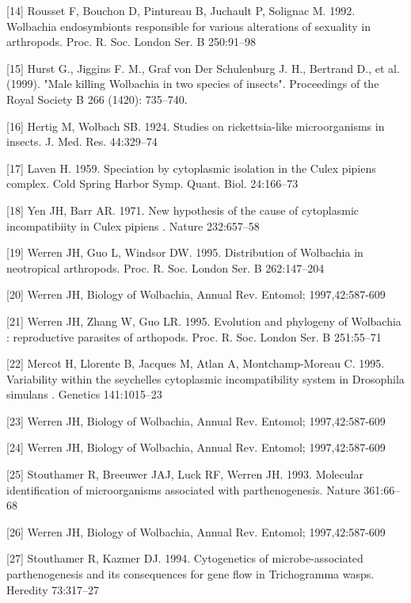 \documentclass[twocolumn]{article}
\begin{document}
[14] Rousset F, Bouchon D, Pintureau B, Juchault P, Solignac M. 1992. Wolbachia endosymbionts responsible for various alterations of sexuality in arthropods. Proc. R. Soc. London Ser. B 250:91–98

[15] Hurst G., Jiggins F. M., Graf von Der Schulenburg J. H., Bertrand D., et al. (1999). "Male killing Wolbachia in two species of insects". Proceedings of the Royal Society B 266 (1420): 735–740.  

[16] Hertig M, Wolbach SB. 1924. Studies on rickettsia-like microorganisms in insects. J. Med. Res. 44:329–74

[17] Laven H. 1959. Speciation by cytoplasmic isolation in the Culex pipiens complex. Cold Spring Harbor Symp. Quant. Biol. 24:166–73

[18] Yen JH, Barr AR. 1971. New hypothesis of the cause of cytoplasmic incompatibiity in Culex pipiens . Nature 232:657–58

[19] Werren JH, Guo L, Windsor DW. 1995. Distribution of Wolbachia in neotropical arthropods. Proc. R. Soc. London Ser. B 262:147–204

[20] Werren JH, Biology of Wolbachia, Annual Rev. Entomol; 1997,42:587-609

[21] Werren JH, Zhang W, Guo LR. 1995. Evolution and phylogeny of Wolbachia : reproductive parasites of arthopods. Proc. R. Soc. London Ser. B 251:55–71 

[22] Mercot H, Llorente B, Jacques M, Atlan A, Montchamp-Moreau C. 1995. Variability within the seychelles cytoplasmic incompatibility system in Drosophila simulans . Genetics 141:1015–23

[23] Werren JH, Biology of Wolbachia, Annual Rev. Entomol; 1997,42:587-609

[24] Werren JH, Biology of Wolbachia, Annual Rev. Entomol; 1997,42:587-609

[25] Stouthamer R, Breeuwer JAJ, Luck RF, Werren JH. 1993. Molecular identification of microorganisms associated with parthenogenesis. Nature 361:66–68

[26] Werren JH, Biology of Wolbachia, Annual Rev. Entomol; 1997,42:587-609

[27] Stouthamer R, Kazmer DJ. 1994. Cytogenetics of microbe-associated parthenogenesis and its consequences for gene flow in Trichogramma wasps. Heredity 73:317–27 
\end{document}

